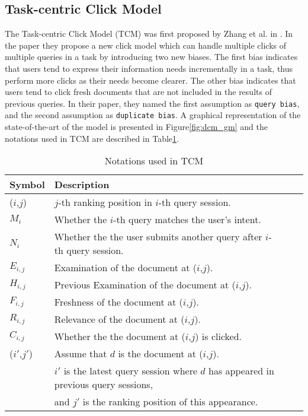 \subsection{Task-centric Click Model}
\label{sec:methodology_tcm}
The Task-centric Click Model (TCM) was first proposed by Zhang et al. in \cite{Zhang2011}. In the paper they propose a new click model which can handle multiple clicks of multiple queries in a task by introducing two new biases. The first bias indicates that users tend to express their information needs incrementally in a task, thus perform more clicks as their needs become clearer. The other bias indicates that users tend to click fresh documents that are not included in the results of previous queries. In their paper, they named the first assumption as \texttt{query bias}, and the second assumption as \texttt{duplicate bias}. A graphical representation of the state-of-the-art of the model is presented in Figure\ref{fig:dcm_gm} and the notations used in TCM are described in Table\ref{table:tcm_notations}. 

\begin{table}[ht]
	\centering
	\begin{tabular}{l|lll|}
		\hline
		Symbol & Description \\
		\hline
		(\(i\),\(j\)) 	& \(j\)-th ranking position in \(i\)-th query session.\\
		$M_i$			& Whether the \(i\)-th query matches the user's intent.\\
		$N_i$ 			& Whether the the user submits another query after \(i\)-th query session.\\		
		$E_{i,j}$ 		& Examination of the document at (\(i\),\(j\)).\\
		$H_{i,j}$ 		& Previous Examination of the document at (\(i\),\(j\)).\\
		$F_{i,j}$ 		& Freshness of the document at (\(i\),\(j\)).\\
		$R_{i,j}$ 		& Relevance of the document at (\(i\),\(j\)).\\
		$C_{i,j}$ 		& Whether the the document at (\(i\),\(j\)) is clicked.\\
		(\(i'\),\(j'\)) & Assume that \(d\) is the document at (\(i\),\(j\)).\\
		&\(i'\) is the latest query session where \(d\) has appeared in previous query sessions,\\ &and \(j'\) is the ranking position of this appearance.\\
		\hline
	\end{tabular}
	\caption{Notations used in TCM}
	\label{table:tcm_notations}
\end{table}

